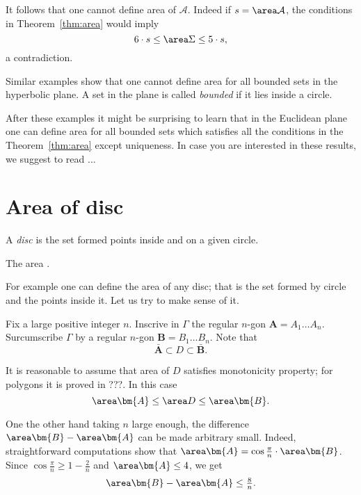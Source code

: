 It follows that one cannot define area of $\mathcal{A}$.
Indeed if $s=\area\mathcal{A}$,
the conditions in Theorem~\ref{thm:area} would imply 
\[6\cdot s\le \area \Sigma\le 5\cdot s,\]
a contradiction. 


Similar examples show that one cannot define area for all bounded sets in the hyperbolic plane.
A set in the plane is called \emph{bounded} if it lies inside a circle.

After these examples it might be surprising to learn that
in the Euclidean plane one can define area for all bounded sets
which satisfies all the conditions in the Theorem~\ref{thm:area} except uniqueness.
In case you are interested in these results, we suggest to read ...


















\section*{Area of disc}

A \emph{disc} is the set 
formed points inside and on a given circle.

The area .

For example one can define the area of any disc;
that is the set formed by circle and the points inside it.
Let us try to make sense of it.

Fix a large positive integer $n$.
Inscrive in $\Gamma$ the regular $n$-gon $\bm{A}=A_1\dots A_n$.
Surcumscribe $\Gamma$ by a regular $n$-gon $\bm{B}=B_1\dots B_n$.
Note that 
\[\bar{\bm{A}}\subset D\subset\bar{\bm{B}}.\]

It is reasonable to assume that area of $D$ satisfies monotonicity property;
for polygons it is proved in ???.
In this case 
\[\area\bm{A}\le\area D\le \area\bm{B}.\]

One the other hand taking $n$ large enough, 
the difference $\area\bm{B}-\area\bm{A}$ can be made arbitrary small.
Indeed, straightforward computations show that
$\area\bm{A}=\cos\tfrac\pi n\cdot\area\bm{B}$. 
Since $\cos\tfrac\pi n\ge 1-\tfrac2n $ and $\area \bm{A}\le 4$,
we get
\[\area\bm{B}-\area\bm{A}\le \tfrac8n.\]










